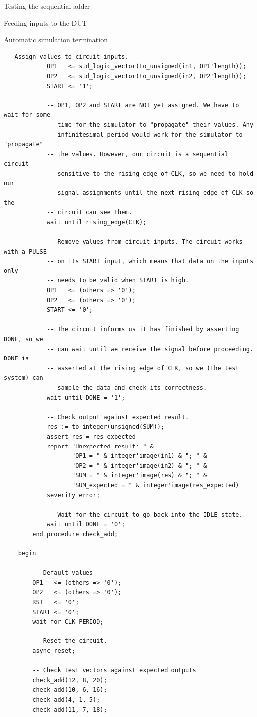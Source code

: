 \documentclass[lab]{course}
\begin{document}
\begin{section}{Testing the sequential adder}
\begin{subsection}{Feeding inputs to the DUT}
\begin{subsubsection}{Automatic simulation termination}
\begin{lstlisting}[caption={Automatic simulation termination}, label={lst:sequential_process_simulation_automatic_termination}]
            -- Assign values to circuit inputs.
            OP1   <= std_logic_vector(to_unsigned(in1, OP1'length));
            OP2   <= std_logic_vector(to_unsigned(in2, OP2'length));
            START <= '1';

            -- OP1, OP2 and START are NOT yet assigned. We have to wait for some
            -- time for the simulator to "propagate" their values. Any
            -- infinitesimal period would work for the simulator to "propagate"
            -- the values. However, our circuit is a sequential circuit
            -- sensitive to the rising edge of CLK, so we need to hold our
            -- signal assignments until the next rising edge of CLK so the
            -- circuit can see them.
            wait until rising_edge(CLK);

            -- Remove values from circuit inputs. The circuit works with a PULSE
            -- on its START input, which means that data on the inputs only
            -- needs to be valid when START is high.
            OP1   <= (others => '0');
            OP2   <= (others => '0');
            START <= '0';

            -- The circuit informs us it has finished by asserting DONE, so we
            -- can wait until we receive the signal before proceeding. DONE is
            -- asserted at the rising edge of CLK, so we (the test system) can
            -- sample the data and check its correctness.
            wait until DONE = '1';

            -- Check output against expected result.
            res := to_integer(unsigned(SUM));
            assert res = res_expected
            report "Unexpected result: " &
                   "OP1 = " & integer'image(in1) & "; " &
                   "OP2 = " & integer'image(in2) & "; " &
                   "SUM = " & integer'image(res) & "; " &
                   "SUM_expected = " & integer'image(res_expected)
            severity error;

            -- Wait for the circuit to go back into the IDLE state.
            wait until DONE = '0';
        end procedure check_add;

    begin

        -- Default values
        OP1   <= (others => '0');
        OP2   <= (others => '0');
        RST   <= '0';
        START <= '0';
        wait for CLK_PERIOD;

        -- Reset the circuit.
        async_reset;

        -- Check test vectors against expected outputs
        check_add(12, 8, 20);
        check_add(10, 6, 16);
        check_add(4, 1, 5);
        check_add(11, 7, 18);


\end{lstlisting}
\end{subsubsection}
\end{subsection}
\end{section}
\end{document}
